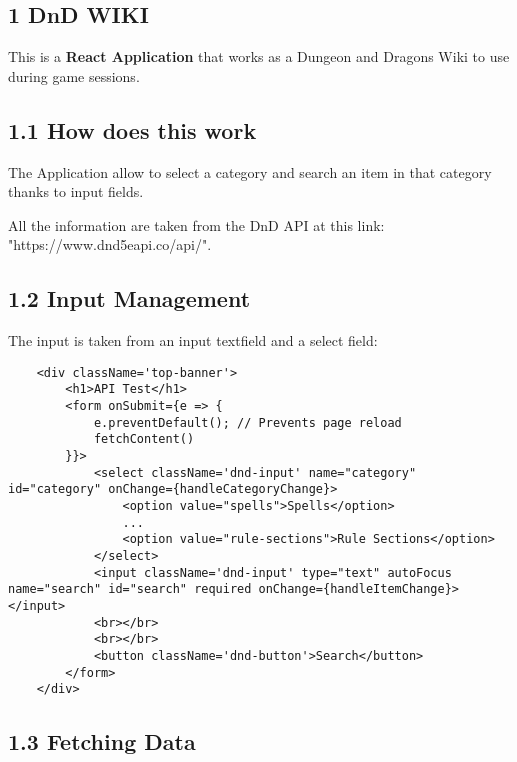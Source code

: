 \documentclass[
]{article}
\begin{document}
\newpage
\setcounter{tocdepth}{4}
\tableofcontents
\begin{flushleft}

\newpage

\newpage
\section{1 DnD WIKI}\label{to-do-react-application}

This is a \textbf{React Application} that works as a Dungeon and Dragons Wiki to use during game sessions.

\subsection{1.1 How does this work}\label{how-works}

The Application allow to select a category and search an item in that category thanks to input fields.

All the information are taken from the DnD API at this link: "https://www.dnd5eapi.co/api/".

\subsection{1.2 Input Management}\label{input-management}

The input is taken from an input textfield and a select field:

\begin{verbatim}
    <div className='top-banner'>
        <h1>API Test</h1>
        <form onSubmit={e => {
            e.preventDefault(); // Prevents page reload
            fetchContent()
        }}>
            <select className='dnd-input' name="category" id="category" onChange={handleCategoryChange}>
                <option value="spells">Spells</option>
                ...
                <option value="rule-sections">Rule Sections</option>
            </select>
            <input className='dnd-input' type="text" autoFocus name="search" id="search" required onChange={handleItemChange}></input>
            <br></br>
            <br></br>
            <button className='dnd-button'>Search</button>
        </form>
    </div>
\end{verbatim}

\subsection{1.3 Fetching Data}\label{fetching-data}


\end{flushleft}
\end{document}
